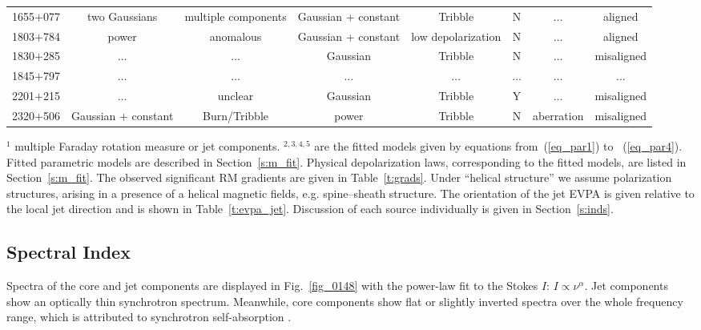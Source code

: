 \documentclass[a4paper,fleqn,usenatbib,useAMS]{mnras}
\begin{document}
\begin{table*}
\begin{minipage}{175mm}
\begin{tabular}{@{}cccccccc@{}}
 1655$+$077 & two Gaussians & multiple components& Gaussian + constant & Tribble & N & $\dots$ & aligned \\
 1803$+$784 & power & anomalous & Gaussian + constant & low depolarization & N & $\dots$ & aligned \\
 1830$+$285 & $\dots$ & $\dots$ & Gaussian & Tribble & N & $\dots$ & misaligned \\
 1845$+$797 & $\dots$ & $\dots$ & $\dots$ &$\dots$ & $\dots$ & $\dots$ & $\dots$ \\
 2201$+$215 & $\dots$ & unclear & Gaussian & Tribble & Y & $\dots$ & misaligned \\
 2320$+$506 & Gaussian + constant & Burn/Tribble & power & Tribble & N & aberration & misaligned \\
 
\hline
\end{tabular}
\medskip

$^1$ multiple Faraday rotation measure or jet components. $^{2,3,4,5}$ are the fitted models given by equations from~(\ref{eq_par1}) to ~(\ref{eq_par4}).
Fitted parametric models are described in Section~\ref{s:m_fit}. Physical depolarization laws, corresponding to the fitted models, are listed in Section~\ref{s:m_fit}. The observed significant RM gradients are given in Table~\ref{t:grads}. Under ``helical structure'' we assume polarization structures, arising in a presence of a helical magnetic fields, e.g. spine--sheath structure. The orientation of the jet EVPA is given relative to the local jet direction and is shown in Table~\ref{t:evpa_jet}.
Discussion of each source individually is given in Section~\ref{s:inds}.
\label{t_results}
\end{minipage}
\end{table*}

\subsection{Spectral Index}
\label{s:spi}
Spectra of the core and jet components are displayed in Fig.~\ref{fig_0148} with the  power-law fit to the Stokes $I$: $I \propto \nu^{\alpha}$.
Jet components show an optically thin synchrotron spectrum.
Meanwhile, core components show flat or slightly inverted spectra over the whole frequency range, which is attributed to synchrotron self-absorption \citep[e.g.][]{blandford_konigl_79,konigl81,sokolovsky_etal11}. 
\end{document}
